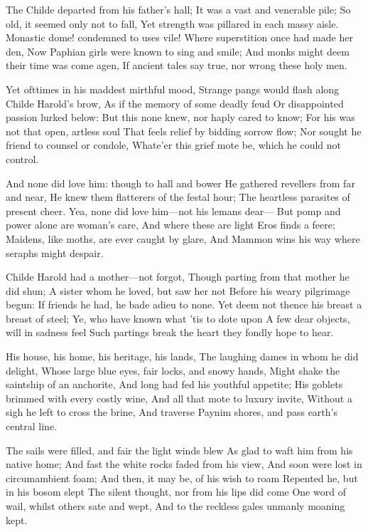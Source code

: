 \documentclass[10pt,twocolumn]{book}
\begin{document}
   The Childe departed from his father's hall;
   It was a vast and venerable pile;
   So old, it seemed only not to fall,
   Yet strength was pillared in each massy aisle.
   Monastic dome! condemned to uses vile!
   Where superstition once had made her den,
   Now Paphian girls were known to sing and smile;
   And monks might deem their time was come agen,
If ancient tales say true, nor wrong these holy men.


   Yet ofttimes in his maddest mirthful mood,
   Strange pangs would flash along Childe Harold's brow,
   As if the memory of some deadly feud
   Or disappointed passion lurked below:
   But this none knew, nor haply cared to know;
   For his was not that open, artless soul
   That feels relief by bidding sorrow flow;
   Nor sought he friend to counsel or condole,
Whate'er this grief mote be, which he could not control.

   And none did love him:  though to hall and bower
   He gathered revellers from far and near,
   He knew them flatterers of the festal hour;
   The heartless parasites of present cheer.
   Yea, none did love him---not his lemans dear---
   But pomp and power alone are woman's care,
   And where these are light Eros finds a feere;
   Maidens, like moths, are ever caught by glare,
And Mammon wins his way where seraphs might despair.

   Childe Harold had a mother---not forgot,
   Though parting from that mother he did shun;
   A sister whom he loved, but saw her not
   Before his weary pilgrimage begun:
   If friends he had, he bade adieu to none.
   Yet deem not thence his breast a breast of steel;
   Ye, who have known what 'tis to dote upon
   A few dear objects, will in sadness feel
Such partings break the heart they fondly hope to hear.

   His house, his home, his heritage, his lands,
   The laughing dames in whom he did delight,
   Whose large blue eyes, fair locks, and snowy hands,
   Might shake the saintship of an anchorite,
   And long had fed his youthful appetite;
   His goblets brimmed with every costly wine,
   And all that mote to luxury invite,
   Without a sigh he left to cross the brine,
And traverse Paynim shores, and pass earth's central line.


   The sails were filled, and fair the light winds blew
   As glad to waft him from his native home;
   And fast the white rocks faded from his view,
   And soon were lost in circumambient foam;
   And then, it may be, of his wish to roam
   Repented he, but in his bosom slept
   The silent thought, nor from his lips did come
   One word of wail, whilst others sate and wept,
And to the reckless gales unmanly moaning kept.
\end{document}
